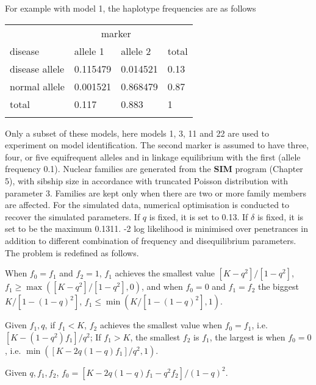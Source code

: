For example with model 1, the haplotype frequencies are as follows \medskip

\begin{tabular}{llll}
\\
                &  \multicolumn{2}{c}{marker}\\ %
disease         &   allele 1 & allele 2 & total\\
disease allele  & 0.115479 &  0.014521 &   0.13\\
normal  allele  & 0.001521 &  0.868479 &   0.87\\
total           & 0.117    &  0.883    &   1\\
\\
\end{tabular}
\medskip

Only a subset of these models, here models 1, 3, 11 and 22 are used to
experiment on model identification.  The second marker is assumed to have
three, four, or five equifrequent alleles and in linkage equilibrium with the
first (allele frequency 0.1).  Nuclear families are generated from the {\bf
SIM} program (Chapter 5), with sibship size in accordance with truncated
Poisson distribution with parameter 3.  Families are kept only when there are
two or more family members are affected.  For the simulated data, numerical
optimisation is conducted to recover the simulated parameters.  If $q$ is
fixed, it is set to 0.13.  If $\delta$ is fixed, it is set to be the maximum
0.1311.  -2 log likelihood is minimised over penetrances in addition to
different combination of frequency and disequilibrium parameters.  The problem
is redefined as follows.

When $f_0=f_1$ and $f_2=1$, $f_1$ achieves the smallest value
${[K-q^2]}/{[1-q^2]}$, $f_1\ge \max({[K-q^2]}/{[1-q^2]},0)$, and when $f_0=0$
and $f_1=f_2$ the biggest ${K}/{[1-(1-q)^2]}$,
$f_1\le\min({K}/{[1-(1-q)^2]},1)$.

Given $f_1,q$, if $f_1<K$, $f_2$ achieves the smallest value when $f_0=f_1$,
i.e. ${[K-(1-q^2)f_1]}/{q^2}$; If $f_1>K$, the smallest $f_2$ is $f_1$, the
largest is when $f_0=0$, i.e.  $\min({[K-2q(1-q)f_1]}/{q^2},1)$.

Given $q, f_1, f_2$, $f_0={[K-2q(1-q)f_1-q^2f_2]}/{(1-q)^2}$.

